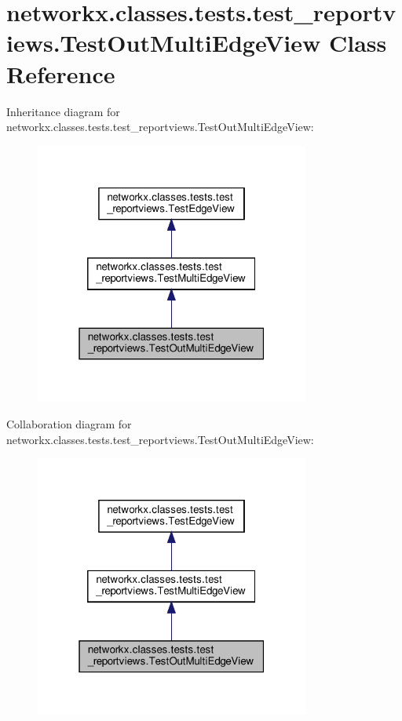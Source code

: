 \hypertarget{classnetworkx_1_1classes_1_1tests_1_1test__reportviews_1_1TestOutMultiEdgeView}{}\section{networkx.\+classes.\+tests.\+test\+\_\+reportviews.\+Test\+Out\+Multi\+Edge\+View Class Reference}
\label{classnetworkx_1_1classes_1_1tests_1_1test__reportviews_1_1TestOutMultiEdgeView}


Inheritance diagram for networkx.\+classes.\+tests.\+test\+\_\+reportviews.\+Test\+Out\+Multi\+Edge\+View\+:
\nopagebreak
\begin{figure}[H]
\begin{center}
\leavevmode
\includegraphics[width=256pt]{classnetworkx_1_1classes_1_1tests_1_1test__reportviews_1_1TestOutMultiEdgeView__inherit__graph}
\end{center}
\end{figure}


Collaboration diagram for networkx.\+classes.\+tests.\+test\+\_\+reportviews.\+Test\+Out\+Multi\+Edge\+View\+:
\nopagebreak
\begin{figure}[H]
\begin{center}
\leavevmode
\includegraphics[width=256pt]{classnetworkx_1_1classes_1_1tests_1_1test__reportviews_1_1TestOutMultiEdgeView__coll__graph}
\end{center}
\end{figure}
